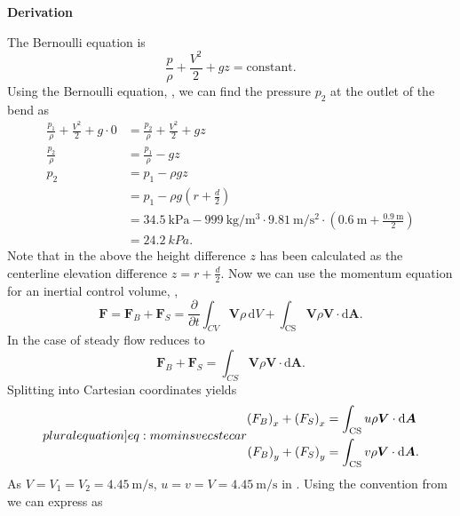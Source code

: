\documentclass[a4paper]{article}
\renewcommand{\Vec}[1]{\boldsymbol{#1}}
\numberwithin{equation}{problem}
\newcommand{\AUheading}[1]{%
  \par\vspace{.4\baselineskip}%
  {\sffamily\bfseries\color{AUblueDark}#1\par}%
  \nobreak%
}
\newenvironment{derivation}[1][Derivation]{%
  \AUheading{#1}
  \begingroup\allowdisplaybreaks
  \setlength{\abovedisplayskip}{6pt}%
  \setlength{\belowdisplayskip}{6pt}%
  \setlength{\abovedisplayshortskip}{4pt}%
  \setlength{\belowdisplayshortskip}{4pt}%
}{\par\endgroup\medskip}
\begin{document}
\begin{derivation}
The Bernoulli equation is
\begin{equation} \label{eq:berneq}
  \frac{p}{\rho} + \frac{V^2}{2} + gz = \mathrm{constant}
.\end{equation}
Using the Bernoulli equation, , we can find the pressure $p_2$ at the outlet of the bend as
\begin{align*}
  \frac{p_1}{\rho} + \frac{V^2}{2} + g \cdot 0 &= \frac{p_2}{\rho} + \frac{V^2}{2} + gz \\
  \frac{p_2}{\rho} &= \frac{p_1}{\rho} - gz \\
  p_2 &= p_1 - \rho g z \\
      &= p_1 - \rho g \left( r + \frac{d}{2} \right) \\
      &= \qty{34,5}{\kilo\pascal} - \qty{999}{\kilogram\per\cubic\meter} \cdot \qty{9,81}{\meter\per\square\second} \cdot \left( \qty{0,6}{\meter} + \frac{\qty{0,9}{\meter} }{2} \right) \\
      &= \qty{24,2}{kPa} 
.\end{align*}
Note that in the above the height difference $z$ has been calculated as the centerline elevation difference $z = r + \frac{d}{2}$.
Now we can use the momentum equation for an inertial control volume, ,
\[ 
\Vec{F} = \Vec{F}_B + \Vec{F}_S = \frac{\partial }{\partial t} \int_{CV} \Vec{V} \rho \, \mathrm{d}V + \int_{\mathrm{CS}} \Vec{V} \rho \Vec{V} \cdot \mathrm{d}\Vec{A}
.\]
In the case of steady flow  reduces to
\begin{equation}\label{eq:mominvecste}
    \Vec{F}_B + \Vec{F}_S = \int_{CS} \Vec{V} \rho \Vec{V} \cdot \mathrm{d} \Vec{A}
.\end{equation}
Splitting  into Cartesian coordinates yields
\begin{subequations} \label[pluralequation]{eq:mominsvecstecar}
  \begin{align}
  \left( F_B \right)_x + \left( F_S \right)_x &= \int_{\mathrm{CS}} u \rho \Vec{V} \cdot \mathrm{d}\Vec{A} \label{eq:mominsvecstex} \\ 
  \left( F_B \right)_y + \left( F_S \right)_y &= \int_{\mathrm{CS}} v \rho \Vec{V} \cdot \mathrm{d}\Vec{A} \label{eq:mominsvecstey}
.\end{align}
\end{subequations}
As $V = V_1 = V_2 = \qty{4,45}{\meter\per\second}$, $u = v = V = \qty{4,45}{\meter\per\second}$ in .
Using the convention from  we can express  as
\begin{align*}

\end{align*}
\end{derivation}
\end{document}
